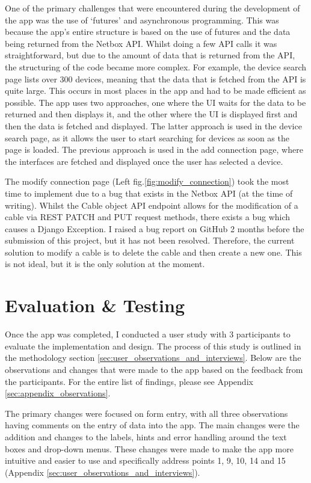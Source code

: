\documentclass [11pt,a4paper]{article}
\begin{document}
One of the primary challenges that were encountered during the development of the app was the use of `futures' and asynchronous programming. This was because the app's entire structure is based on the use of futures and the data being returned from the Netbox API. Whilst doing a few API calls it was straightforward, but due to the amount of data that is returned from the API, the structuring of the code became more complex. For example, the device search page lists over 300 devices, meaning that the data that is fetched from the API is quite large. This occurs in most places in the app and had to be made efficient as possible. The app uses two approaches, one where the UI waits for the data to be returned and then displays it, and the other where the UI is displayed first and then the data is fetched and displayed. The latter approach is used in the device search page, as it allows the user to start searching for devices as soon as the page is loaded. The previous approach is used in the add connection page, where the interfaces are fetched and displayed once the user has selected a device. 

The modify connection page (Left fig.\ref{fig:modify_connection}) took the most time to implement due to a bug that exists in the Netbox API (at the time of writing). Whilst the Cable object API endpoint allows for the modification of a cable via REST PATCH and PUT request methods, there exists a bug which causes a Django Exception. I raised a bug report on GitHub \cite{netboxBug} 2 months before the submission of this project, but it has not been resolved. Therefore, the current solution to modify a cable is to delete the cable and then create a new one. This is not ideal, but it is the only solution at the moment. 


\section{Evaluation \& Testing}
\label{sec:evaluation}
Once the app was completed, I conducted a user study with 3 participants to evaluate the implementation and design. The process of this study is outlined in the methodology section \ref{sec:user_observations_and_interviews}. Below are the observations and changes that were made to the app based on the feedback from the participants. For the entire list of findings, please see Appendix \ref{sec:appendix_observations}. 

The primary changes were focused on form entry, with all three observations having comments on the entry of data into the app. The main changes were the addition and changes to the labels, hints and error handling around the text boxes and drop-down menus. These changes were made to make the app more intuitive and easier to use and specifically address points 1, 9, 10, 14 and 15 (Appendix \ref{sec:user_observations_and_interviews}). 
\end{document}
